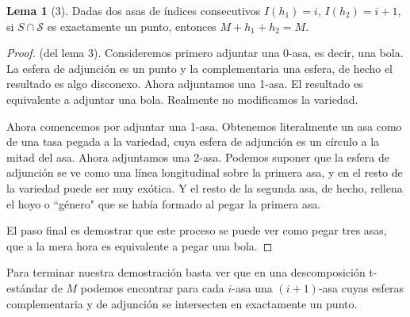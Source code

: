 \documentclass[spanish]{book}
\theoremstyle{definition}
\newtheorem*{lema}{Lema}
\begin{document}
\begin{lema}[3]
	Dadas dos asas de índices consecutivos $I(h_1)=i$, $I(h_2)=i+1$, si $S\cap\mathcal{S}$ es exactamente un punto, entonces $M+h_1+h_2=M$.
\end{lema}
\begin{proof}
	(del lema 3). Consideremos primero adjuntar una 0-asa, es decir, una bola. La esfera de adjunción es un punto y la complementaria una esfera, de hecho el resultado es algo disconexo. Ahora adjuntamos una 1-asa. El resultado es equivalente a adjuntar una bola. Realmente no modificamos la variedad.
	
	Ahora comencemos por adjuntar una 1-asa. Obtenemos literalmente un asa como de una tasa pegada a la variedad, cuya esfera de adjunción es un círculo a la mitad del asa. Ahora adjuntamos una 2-asa. Podemos suponer que la esfera de adjunción se ve como una línea longitudinal sobre la primera asa, y en el resto de la variedad puede ser muy exótica. Y el resto de la segunda asa, de hecho, rellena el hoyo o ``género" que se había formado al pegar la primera asa.
	
	El paso final es demostrar que este proceso se puede ver como pegar tres asas, que a la mera hora es equivalente a pegar una bola.
\end{proof}

Para terminar nuestra demostración basta ver que en una descomposición t-estándar de $M$ podemos encontrar para cada $i$-asa una $(i+1)$-asa cuyas esferas complementaria y de adjunción se intersecten en exactamente un punto.
\end{document}
